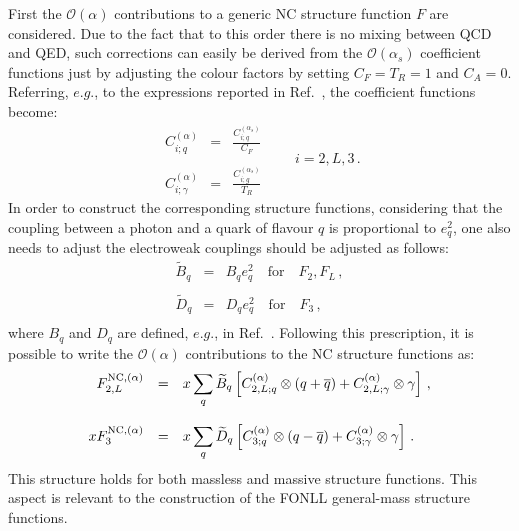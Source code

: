 First  the $\mathcal{O}(\alpha)$
contributions to a generic NC structure function $F$ are considered.
%
Due to the fact that to this order there is no mixing between QCD and
QED, such corrections can easily be derived from the
$\mathcal{O}(\alpha_s)$ coefficient functions just by adjusting the
colour factors by setting $C_F=T_R=1$ and $C_A=0$.
%
Referring, $e.g.$, to the expressions reported in
Ref.~\cite{Ellis:1991qj}, the coefficient functions become:
\begin{equation}\label{eq:alphaCFs}
\begin{array}{rcl}
\displaystyle C_{i;q}^{(\alpha)} &=& \displaystyle \frac{C_{i;q}^{(\alpha_s)}}{C_F}\\
\\
\displaystyle C_{i;\gamma}^{(\alpha)} &=& \displaystyle \frac{C_{i;g}^{(\alpha_s)}}{T_R}
\end{array}\qquad i = 2,L,3\,.
\end{equation}
In order to construct the corresponding structure
functions, considering that the coupling between a photon and a quark
of flavour $q$ is proportional to $e_q^2$, one also needs to adjust
the electroweak couplings should be adjusted as follows:
 \begin{equation}
\begin{array}{rcl}
\widetilde{B}_q &=& B_qe_q^2\quad\mbox{for}\quad F_2,F_L\,, \\
\\
\widetilde{D}_q &=& D_qe_q^2\quad\mbox{for}\quad F_3\,, \\
\end{array}
\end{equation}
where $B_q$ and $D_q$ are defined, $e.g.$, in
Ref.~\cite{Adloff:2003uh}.
%
Following this prescription, it is possible to write the
$\mathcal{O}(\alpha)$ contributions to the NC structure functions as:
\begin{equation}
\begin{array}{rcl}
F_{2,L}^{{\rm NC},(\alpha)} &=& \displaystyle x \sum_{q} \widetilde{B}_q\left[C_{2,L;q}^{(\alpha)}\otimes
(q+\overline{q}) + C_{2,L;\gamma}^{(\alpha)} \otimes \gamma
                         \right]\,,\\
\\
xF_3^{{\rm NC},(\alpha)} &=& \displaystyle x \sum_{q} \widetilde{D}_q\left[C_{3;q}^{(\alpha)}\otimes
(q-\overline{q}) + C_{3;\gamma}^{(\alpha)} \otimes \gamma
                         \right]\,.
\end{array}
\end{equation}
This structure holds for both massless and massive
structure functions. This aspect is relevant to the construction of
the FONLL general-mass structure functions.

